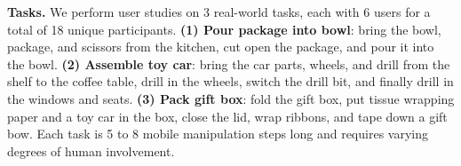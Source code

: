 \textbf{Tasks.} We perform user studies on 3 real-world tasks, each with 6 users for a total of 18 unique participants.
\textbf{(1) Pour package into bowl}: bring the bowl, package, and scissors from the kitchen, cut open the package, and pour it into the bowl.
\textbf{(2) Assemble toy car}: bring the car parts, wheels, and drill from the shelf to the coffee table, drill in the wheels, switch the drill bit, and finally drill in the windows and seats.
\textbf{(3) Pack gift box}: fold the gift box, put tissue wrapping paper and a toy car in the box, close the lid, wrap ribbons, and tape down a gift bow.
Each task is 5 to 8 mobile manipulation steps long and requires varying degrees of human involvement.


